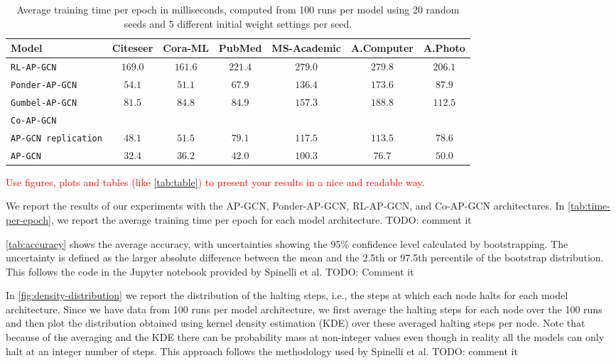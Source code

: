 \documentclass{gdl}
\begin{document}
\begin{table}[h]
    \small\sf\centering
    \caption{Average training time per epoch in milliseconds, computed from 100 runs per model using 20 random seeds and 5 different initial weight settings per seed.}
    \begin{tabular}{l c c c c c c}
        \toprule
        Model & Citeseer & Cora-ML & PubMed & MS-Academic & A.Computer & A.Photo   \\
        \midrule
        \texttt{RL-AP-GCN} &$169.0$&$161.6$&$221.4$&$279.0$&$279.8$&$206.1$  \\
        \texttt{Ponder-AP-GCN} &$54.1$&$51.1$&$67.9$&$136.4$&$173.6$&$87.9$   \\
        \texttt{Gumbel-AP-GCN} &$81.5$&$84.8$&$84.9$&$157.3$&$188.8$&$112.5$   \\
        \texttt{Co-AP-GCN}  \\
        \texttt{AP-GCN replication} &$48.1$&$51.5$&$79.1$&$117.5$&$113.5$&$78.6$  \\
        \midrule
        \texttt{AP-GCN} & $32.4$ & $36.2$ & $42.0$ & $100.3$ & $76.7$ & $50.0$ \\
        \bottomrule 
    \end{tabular}
    \label{tab:time-per-epoch}
\end{table}

\textcolor{red}{Use figures, plots and tables (like \autoref{tab:table}) to present your results in a nice and readable way.}

We report the results of our experiments with the AP-GCN, Ponder-AP-GCN, RL-AP-GCN, and Co-AP-GCN architectures. In \autoref{tab:time-per-epoch}, we report the average training time per epoch for each model architecture. TODO: comment it 

\autoref{tab:accuracy} shows the average accuracy, with uncertainties showing the 95\% confidence level calculated by bootstrapping. The uncertainty is defined as the larger absolute difference between the mean and the 2.5th or 97.5th percentile of the bootstrap distribution. This follows the code in the Jupyter notebook provided by Spinelli et al.  TODO: Comment it

In \autoref{fig:density-distribution} we report the distribution of the halting steps, i.e., the steps at which each node halts for each model architecture. Since we have data from 100 runs per model architecture, we first average the halting steps for each node over the 100 runs and then plot the distribution obtained using kernel density estimation (KDE) over these averaged halting steps per node. Note that because of the averaging and the KDE there can be probability mass at non-integer values even though in reality all the models can only halt at an integer number of steps. This approach follows the methodology used by Spinelli et al. TODO: comment it
\end{document}
